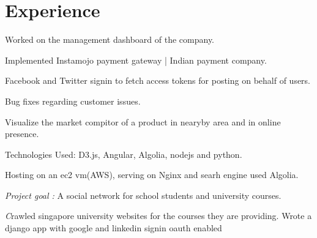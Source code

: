 \documentclass[]{deedy-resume-openfont}
\begin{document}
\begin{minipage}[t]{0.66\textwidth}


\section{Experience}

\vspace{\topsep} %
\begin{tightemize}
\item Worked on the management dashboard of the company.
\item Implemented Instamojo payment gateway | Indian payment company.
\item Facebook and Twitter signin to fetch access tokens for posting on behalf of users.
\item Bug fixes regarding customer issues.
\vspace{\topsep} %
\end{tightemize}

\vspace{\topsep} %
\begin{tightemize}
\item Visualize the market compitor of a product in nearyby area and in online presence.
\item Technologies Used: D3.js, Angular, Algolia, nodejs and python.
\item Hosting on an ec2 vm(AWS), serving on Nginx and searh engine used Algolia.
\vspace{\topsep} %
\end{tightemize}

\begin{tightemize}
\item \emph{Project goal :} A social network for school students and university courses.
\item \emph Crawled singapore university websites for the courses they are providing. Wrote a django app with google and linkedin signin oauth enabled \end{tightemize}
\sectionsep


\end{minipage}
\end{document}
